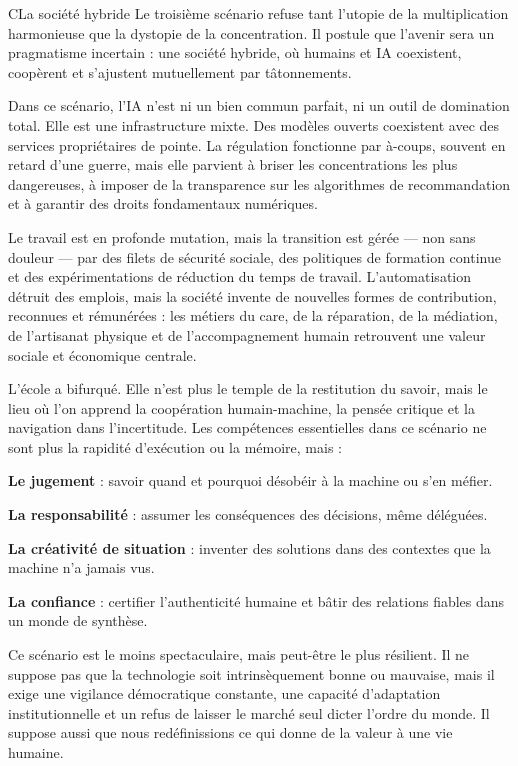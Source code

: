\begin{scenariobox}{C}{La société hybride}
Le troisième scénario refuse tant l'utopie de la multiplication harmonieuse que la dystopie de la concentration. Il postule que l'avenir sera un pragmatisme incertain : une société hybride, où humains et IA coexistent, coopèrent et s'ajustent mutuellement par tâtonnements.

Dans ce scénario, l'IA n'est ni un bien commun parfait, ni un outil de domination total. Elle est une infrastructure mixte. Des modèles ouverts coexistent avec des services propriétaires de pointe. La régulation fonctionne par à-coups, souvent en retard d'une guerre, mais elle parvient à briser les concentrations les plus dangereuses, à imposer de la transparence sur les algorithmes de recommandation et à garantir des droits fondamentaux numériques.

Le travail est en profonde mutation, mais la transition est gérée — non sans douleur — par des filets de sécurité sociale, des politiques de formation continue et des expérimentations de réduction du temps de travail. L'automatisation détruit des emplois, mais la société invente de nouvelles formes de contribution, reconnues et rémunérées : les métiers du care, de la réparation, de la médiation, de l'artisanat physique et de l'accompagnement humain retrouvent une valeur sociale et économique centrale.

L'école a bifurqué. Elle n'est plus le temple de la restitution du savoir, mais le lieu où l'on apprend la coopération humain-machine, la pensée critique et la navigation dans l'incertitude. Les compétences essentielles dans ce scénario ne sont plus la rapidité d'exécution ou la mémoire, mais :

\begin{eplist}
\item \textbf{Le jugement} : savoir quand et pourquoi désobéir à la machine ou s'en méfier.
\item \textbf{La responsabilité} : assumer les conséquences des décisions, même déléguées.
\item \textbf{La créativité de situation} : inventer des solutions dans des contextes que la machine n'a jamais vus.
\item \textbf{La confiance} : certifier l'authenticité humaine et bâtir des relations fiables dans un monde de synthèse.
\end{eplist}
Ce scénario est le moins spectaculaire, mais peut-être le plus résilient. Il ne suppose pas que la technologie soit intrinsèquement bonne ou mauvaise, mais il exige une vigilance démocratique constante, une capacité d'adaptation institutionnelle et un refus de laisser le marché seul dicter l'ordre du monde. Il suppose aussi que nous redéfinissions ce qui donne de la valeur à une vie humaine.
\end{scenariobox}

